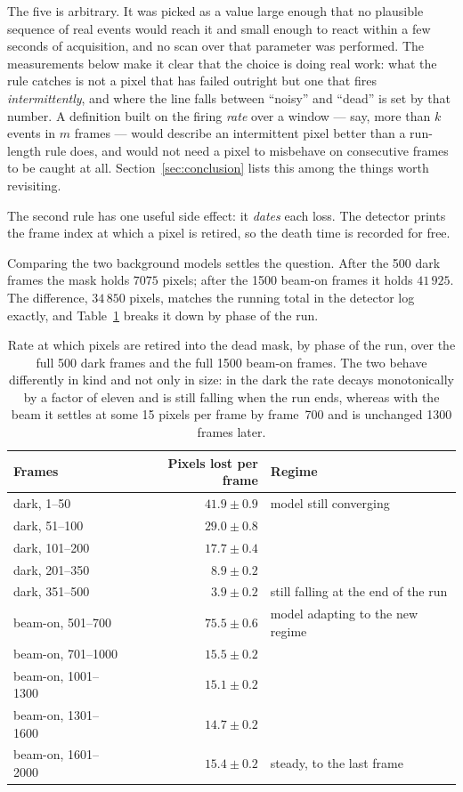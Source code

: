 \documentclass[a4paper,headsepline,oneside,11pt]{scrartcl}
\begin{document}
The five is arbitrary. It was picked as a value large enough that no plausible
sequence of real events would reach it and small enough to react within a few
seconds of acquisition, and no scan over that parameter was performed. The
measurements below make it clear that the choice is doing real work: what the
rule catches is not a pixel that has failed outright but one that fires
\emph{intermittently}, and where the line falls between ``noisy'' and ``dead''
is set by that number. A definition built on the firing \emph{rate} over a
window --- say, more than $k$ events in $m$ frames --- would describe an
intermittent pixel better than a run-length rule does, and would not need a
pixel to misbehave on consecutive frames to be caught at all.
Section~\ref{sec:conclusion} lists this among the things worth revisiting.

The second rule has one useful side effect: it \emph{dates} each loss. The
detector prints the frame index at which a pixel is retired, so the death time
is recorded for free.

Comparing the two background models settles the question. After the 500 dark
frames the mask holds $7075$ pixels; after the 1500 beam-on frames it holds
$41\,925$. The difference, $34\,850$ pixels, matches the running total in the
detector log exactly, and Table~\ref{tab:deadpixel_rate} breaks it down by phase
of the run.

\begin{table}[htbp]
  \centering
  \begin{tabularx}{0.8\linewidth}{@{}l r X@{}}
    \toprule
    \textbf{Frames} & \textbf{Pixels lost per frame} & \textbf{Regime} \\
    \midrule
    dark, 1--50      & $41.9 \pm 0.9$ & model still converging \\
    dark, 51--100    & $29.0 \pm 0.8$ & \\
    dark, 101--200   & $17.7 \pm 0.4$ & \\
    dark, 201--350   & $8.9 \pm 0.2$  & \\
    dark, 351--500   & $\mathbf{3.9 \pm 0.2}$ & still falling at the end of the run \\
    \midrule
    beam-on, 501--700   & $75.5 \pm 0.6$ & model adapting to the new regime \\
    beam-on, 701--1000  & $15.5 \pm 0.2$ & \\
    beam-on, 1001--1300 & $15.1 \pm 0.2$ & \\
    beam-on, 1301--1600 & $14.7 \pm 0.2$ & \\
    beam-on, 1601--2000 & $\mathbf{15.4 \pm 0.2}$ & steady, to the last frame \\
    \bottomrule
  \end{tabularx}
  \caption{Rate at which pixels are retired into the dead mask, by phase of the
  run, over the full 500 dark frames and the full 1500 beam-on frames. The two
  behave differently in kind and not only in size: in the dark the rate decays
  monotonically by a factor of eleven and is still falling when the run ends,
  whereas with the beam it settles at some 15 pixels per frame by frame~700 and
  is unchanged 1300 frames later.}
  \label{tab:deadpixel_rate}
\end{table}
\end{document}
